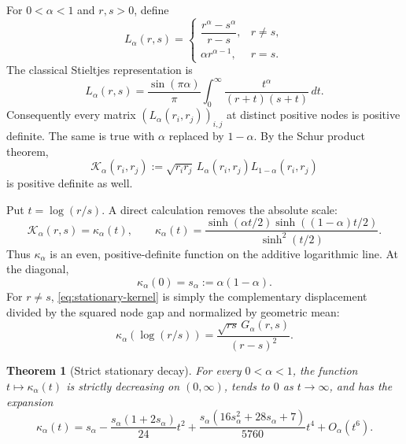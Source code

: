 \documentclass[11pt]{article}
\newtheorem{theorem}{Theorem}[section]
\theoremstyle{definition}
\theoremstyle{remark}
\begin{document}
For $0<\alpha<1$ and $r,s>0$, define
\begin{equation}\label{eq:Loewner-alpha}
 L_\alpha(r,s)=
 \begin{cases}
 \dfrac{r^\alpha-s^\alpha}{r-s},&r\ne s,\\[6pt]
 \alpha r^{\alpha-1},&r=s.
 \end{cases}
\end{equation}
The classical Stieltjes representation is
\begin{equation}\label{eq:Loewner-integral}
 L_\alpha(r,s)
 =\frac{\sin(\pi\alpha)}{\pi}
 \int_0^\infty \frac{t^\alpha}{(r+t)(s+t)}\,dt.
\end{equation}
Consequently every matrix $(L_\alpha(r_i,r_j))_{i,j}$ at distinct positive nodes is positive definite.  The same is true with $\alpha$ replaced by $1-\alpha$.  By the Schur product theorem,
\begin{equation}\label{eq:Schur-Loewner}
 \mathcal K_\alpha(r_i,r_j)
 :=\sqrt{r_ir_j}\,L_\alpha(r_i,r_j)L_{1-\alpha}(r_i,r_j)
\end{equation}
is positive definite as well.

Put $t=\log(r/s)$.  A direct calculation removes the absolute scale:
\begin{equation}\label{eq:stationary-kernel}
 \mathcal K_\alpha(r,s)=\kappa_\alpha(t),
 \qquad
 \kappa_\alpha(t)
 =\frac{\sinh(\alpha t/2)\sinh((1-\alpha)t/2)}{\sinh^2(t/2)}.
\end{equation}
Thus $\kappa_\alpha$ is an even, positive-definite function on the additive logarithmic line.  At the diagonal,
\begin{equation}\label{eq:kappa-zero}
 \kappa_\alpha(0)=s_\alpha:=\alpha(1-\alpha).
\end{equation}
For $r\ne s$, \eqref{eq:stationary-kernel} is simply the complementary displacement divided by the squared node gap and normalized by geometric mean:
\begin{equation}\label{eq:kappa-G}
 \kappa_\alpha(\log(r/s))
 =\frac{\sqrt{rs}\,G_\alpha(r,s)}{(r-s)^2}.
\end{equation}

\begin{theorem}[Strict stationary decay]\label{thm:kappa-decay}
For every $0<\alpha<1$, the function $t\mapsto\kappa_\alpha(t)$ is strictly decreasing on $(0,\infty)$, tends to $0$ as $t\to\infty$, and has the expansion
\begin{equation}\label{eq:kappa-series}
 \kappa_\alpha(t)
 =s_\alpha
 -\frac{s_\alpha(1+2s_\alpha)}{24}t^2
 +\frac{s_\alpha(16s_\alpha^2+28s_\alpha+7)}{5760}t^4
 +O_\alpha(t^6).
\end{equation}
\end{theorem}
\end{document}
